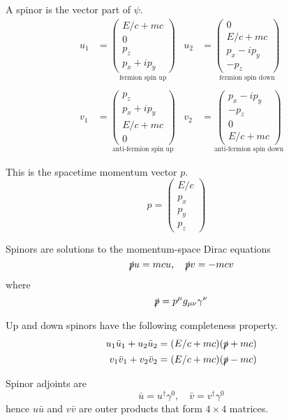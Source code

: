 \documentclass[12pt]{article}
\begin{document}
A spinor is the vector part of $\psi$.
\begin{align*}
u_1&=\underset{\text{fermion spin up}}{\begin{pmatrix}E/c+mc\\0\\p_z\\p_x+ip_y\end{pmatrix}}
& u_2&=\underset{\text{fermion spin down}}{\begin{pmatrix}0\\E/c+mc\\p_x-ip_y\\-p_z\end{pmatrix}}
\\
\\
v_1&=\underset{\text{anti-fermion spin up}}{\begin{pmatrix}p_z\\p_x+ip_y\\E/c+mc\\0\end{pmatrix}}
& v_2&=\underset{\text{anti-fermion spin down}}{\begin{pmatrix}p_x-ip_y\\-p_z\\0\\E/c+mc\end{pmatrix}}
\end{align*}

This is the spacetime momentum vector $p$.
\begin{equation*}
p=\begin{pmatrix}E/c\\p_x\\p_y\\p_z\end{pmatrix}\quad
\end{equation*}

Spinors are solutions to the momentum-space Dirac equations
\begin{equation*}
\slashed pu=mcu,
\quad
\slashed pv=-mcv
\end{equation*}
where
\begin{equation*}
\slashed p=p^\mu g_{\mu\nu}\gamma^\nu
\end{equation*}

Up and down spinors have the following completeness property.
\begin{align*}
u_1\bar u_1+u_2\bar u_2&=(E/c+mc)(\slashed p+mc)
\\
v_1\bar v_1+v_2\bar v_2&=(E/c+mc)(\slashed p-mc)
\end{align*}

Spinor adjoints are
\begin{equation*}
\bar u=u^\dag\gamma^0,
\quad
\bar v=v^\dag\gamma^0
\end{equation*}
hence $u\bar u$ and $v\bar v$ are outer products that form $4\times4$ matrices.
\end{document}
